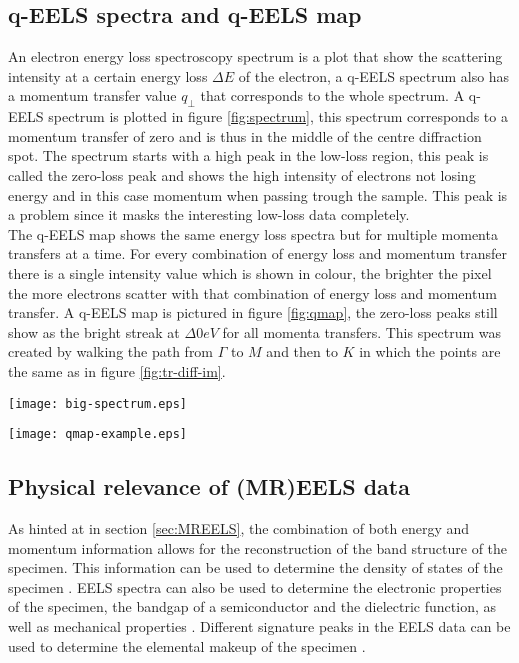 \subsection{q-EELS spectra and q-EELS map}
An electron energy loss spectroscopy spectrum is a plot that show the scattering intensity at a certain energy loss $\Delta E$ of the electron, a q-EELS spectrum also has a momentum transfer value $q_{\perp}$ that corresponds to the whole spectrum. A q-EELS spectrum is plotted in figure \ref{fig:spectrum}, this spectrum corresponds to a momentum transfer of zero and is thus in the middle of the centre diffraction spot. The spectrum starts with a high peak in the low-loss region, this peak is called the zero-loss peak and shows the high intensity of electrons not losing energy and in this case momentum when passing trough the sample. This peak is a problem since it masks the interesting low-loss data completely.\\
The q-EELS map shows the same energy loss spectra but for multiple momenta transfers at a time. For every combination of energy loss and momentum transfer there is a single intensity value which is shown in colour, the brighter the pixel the more electrons scatter with that combination of energy loss and momentum transfer. A q-EELS map is pictured in figure \ref{fig:qmap}, the zero-loss peaks still show as the bright streak at $\Delta 0 eV$ for all momenta transfers. This spectrum was created by walking the path from $\Gamma$ to $M$ and then to $K$ in which the points are the same as in figure \ref{fig:tr-diff-im}.

\begin{minipage}{.45\textwidth}
	\centering
	\captionsetup{width=0.8\linewidth}
	\texttt{[image: big-spectrum.eps]}
	\label{fig:spectrum}
\end{minipage}%
\begin{minipage}{.45\textwidth}
	\centering
	\captionsetup{width=0.8\linewidth}
	\texttt{[image: qmap-example.eps]}
	\label{fig:qmap}
\end{minipage}

\subsection{Physical relevance of (MR)EELS data}
As hinted at in section \ref{sec:MREELS}, the combination of both energy and momentum information allows for the reconstruction of the band structure of the specimen. This information can be used to determine the density of states of the specimen \cite{doi:10.1021/acs.nanolett.9b03928} \cite{Egerton_2008}.
EELS spectra can also be used to determine the electronic properties of the specimen, the bandgap of a semiconductor and the dielectric function, as well as mechanical properties \cite{Egerton_2008}.
Different signature peaks in the EELS data can be used to determine the elemental makeup of the specimen \cite{Egerton_2008}.